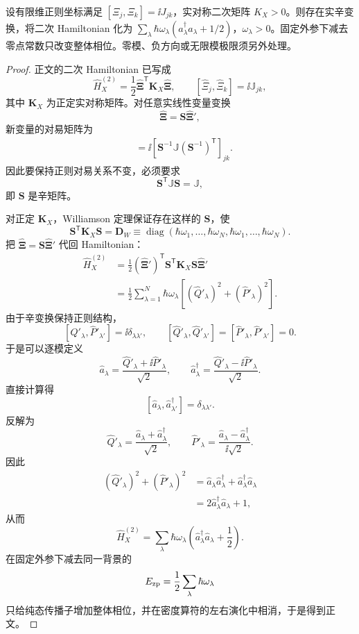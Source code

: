 \begin{theorem}
设有限维正则坐标满足 $[\Xi_j,\Xi_k]=\ii J_{jk}$，实对称二次矩阵 $K_X>0$。则存在实辛变换，将二次 Hamiltonian 化为 $\sum_\lambda\hbar\omega_\lambda(a_\lambda^\dagger a_\lambda+1/2)$，$\omega_\lambda>0$。固定外参下减去零点常数只改变整体相位。零模、负方向或无限模极限须另外处理。
\end{theorem}
\begin{proof}
正文的二次 Hamiltonian 已写成
\[
\hat H_X^{(2)}
=
\frac12
\hat{\boldsymbol\Xi}^{\mathsf T}
\mathbf K_X
\hat{\boldsymbol\Xi},
\qquad
[\hat\Xi_j,\hat\Xi_k]
=
\ii\mathbb J_{jk},
\]
其中 $\mathbf K_X$ 为正定实对称矩阵。对任意实线性变量变换
\[
\hat{\boldsymbol\Xi}
=
\mathbf S\hat{\boldsymbol\Xi}',
\]
新变量的对易矩阵为
\begin{align*}
[\hat\Xi'_j,\hat\Xi'_k]
&=
\ii
\left[
\mathbf S^{-1}\mathbb J(\mathbf S^{-1})^{\mathsf T}
\right]_{jk}.
\end{align*}
因此要保持正则对易关系不变，必须要求
\[
\mathbf S^{\mathsf T}\mathbb J\mathbf S
=
\mathbb J,
\]
即 $\mathbf S$ 是辛矩阵。

对正定 $\mathbf K_X$，Williamson 定理保证存在这样的 $\mathbf S$，使
\[
\mathbf S^{\mathsf T}\mathbf K_X\mathbf S
=
\mathbf D_W
\equiv
\operatorname{diag}
(\hbar\omega_1,\ldots,\hbar\omega_N,
 \hbar\omega_1,\ldots,\hbar\omega_N).
\]
把 $\hat{\boldsymbol\Xi}=\mathbf S\hat{\boldsymbol\Xi}'$ 代回 Hamiltonian：
\begin{align*}
\hat H_X^{(2)}
&=
\frac12
(\hat{\boldsymbol\Xi}')^{\mathsf T}
\mathbf S^{\mathsf T}\mathbf K_X\mathbf S
\hat{\boldsymbol\Xi}'\\
&=
\frac12
\sum_{\lambda=1}^{N}
\hbar\omega_\lambda
\left[
(\hat Q'_\lambda)^2+(\hat P'_\lambda)^2
\right].
\end{align*}
由于辛变换保持正则结构，
\[
[\hat Q'_\lambda,\hat P'_{\lambda'}]
=
\ii\delta_{\lambda\lambda'},
\qquad
[\hat Q'_\lambda,\hat Q'_{\lambda'}]
=
[\hat P'_\lambda,\hat P'_{\lambda'}]
=
0.
\]
于是可以逐模定义
\[
\hat a_\lambda
=
\frac{\hat Q'_\lambda+\ii\hat P'_\lambda}{\sqrt2},
\qquad
\hat a_\lambda^\dagger
=
\frac{\hat Q'_\lambda-\ii\hat P'_\lambda}{\sqrt2}.
\]
直接计算得
\[
[\hat a_\lambda,\hat a_{\lambda'}^\dagger]
=
\delta_{\lambda\lambda'}.
\]
反解为
\[
\hat Q'_\lambda
=
\frac{\hat a_\lambda+\hat a_\lambda^\dagger}{\sqrt2},
\qquad
\hat P'_\lambda
=
\frac{\hat a_\lambda-\hat a_\lambda^\dagger}{\ii\sqrt2}.
\]
因此
\begin{align*}
(\hat Q'_\lambda)^2+(\hat P'_\lambda)^2
&=
\hat a_\lambda\hat a_\lambda^\dagger
+
\hat a_\lambda^\dagger\hat a_\lambda\\
&=
2\hat a_\lambda^\dagger\hat a_\lambda+1,
\end{align*}
从而
\[
\hat H_X^{(2)}
=
\sum_\lambda
\hbar\omega_\lambda
\left(
\hat a_\lambda^\dagger\hat a_\lambda+\frac12
\right).
\]
在固定外参下减去同一背景的
\[
E_{\rm zp}
=
\frac12\sum_\lambda\hbar\omega_\lambda
\]
只给纯态传播子增加整体相位，并在密度算符的左右演化中相消，于是得到正文。


\end{proof}
